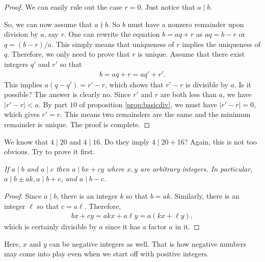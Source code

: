 \documentclass{subfile}
\begin{document}
	\begin{proof}
		We can easily rule out the case $r=0$. Just notice that $a\mid b$.

		So, we can now assume that $a\nmid b$. So $b$ must have a nonzero remainder upon division by $a$, say $r$. One can rewrite the equation $b=aq+r$ as $aq=b-r$ or $q=(b-r)/a$. This simply means that uniqueness of $r$ implies the uniqueness of $q$. Therefore, we only need to prove that $r$ is unique. Assume that there exist integers $q'$ and $r'$ so that
		\begin{align*}
			b=aq+r=aq'+r'.
		\end{align*}
		This implies $a(q-q')=r'-r$, which shows that $r'-r$ is divisible by $a$. Is it possible? The answer is clearly no. Since $r'$ and $r$ are both less than $a$, we have $|r'-r|<a$. By part $10$ of proposition \eqref{prop:basicdiv}, we must have $|r'-r|=0$, which gives $r'=r$. This means two remainders are the same and the minimum remainder is unique. The proof is complete.
	\end{proof}


	\begin{question}
		We know that $4\mid 20$ and $4\mid 16$. Do they imply $4\mid 20+16$? Again, this is not too obvious. Try to prove it first.
	\end{question}

	\begin{proposition}\slshape\label{prop:a|bx+cy}
		If $a\mid b$ and $a\mid c$ then $a\mid bx+cy$ where $x,y$ are arbitrary integers. In particular, $a\mid b\pm ak,a\mid b+c$, and $a\mid b-c$.
	\end{proposition}

	\begin{proof}
		Since $a\mid b$, there is an integer $k$ so that $b=ak$. Similarly, there is an integer $\ell$ so that $c=a\ell$. Therefore,
		\begin{align*}
			bx+cy=akx+a\ell y=a(kx+\ell y),
		\end{align*}
		which is certainly divisible by $a$ since it has a factor $a$ in it.
	\end{proof}

	\begin{note}
		Here, $x$ and $y$ can be negative integers as well. That is how negative numbers may come into play even when we start off with positive integers.
	\end{note}
\end{document}
